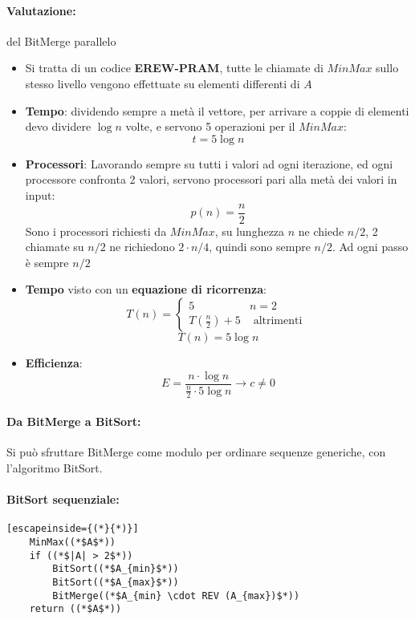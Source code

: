\newpage

\paragraph{Valutazione:} del BitMerge parallelo
\begin{itemize}
	\item Si tratta di un codice \textbf{EREW-PRAM}, tutte le chiamate di $MinMax$ sullo stesso livello vengono effettuate su elementi differenti di $A$
	
	\item \textbf{Tempo}: dividendo sempre a metà il vettore, per arrivare a coppie di elementi devo dividere $\log n$ volte, e servono 5 operazioni per il $MinMax$:
	$$ t = 5 \log n $$
	
	\item \textbf{Processori}: Lavorando sempre su tutti i valori ad ogni iterazione, ed ogni processore confronta 2 valori, servono processori pari alla metà dei valori in input:
	$$ p(n) = \frac{n}{2} $$
	Sono i processori richiesti da $MinMax$, su lunghezza $n$ ne chiede $n/2$, 2 chiamate su $n/2$ ne richiedono $2 \cdot n/4$, quindi sono sempre $n/2$. Ad ogni passo è sempre $n/2$
	
	\item \textbf{Tempo} visto con un \textbf{equazione di ricorrenza}: 
	$$ T(n) = \begin{cases}
		5 & n = 2 \\
		T(\frac{n}{2}) + 5 & \text{ altrimenti }
	\end{cases}
	$$
	$$ T(n) = 5 \log n $$
	
	\item \textbf{Efficienza}:
	$$ E = \frac{n \cdot \log n}{\frac{n}{2} \cdot 5 \log n} \rightarrow c \neq 0 $$
\end{itemize} 

\newpage

\paragraph{Da BitMerge a BitSort:} Si può sfruttare BitMerge come modulo per ordinare sequenze generiche, con l'algoritmo BitSort.\\

\paragraph{BitSort sequenziale:} \hfill 
\begin{lstlisting}[escapeinside={(*}{*)}]
	MinMax((*$A$*))
	if ((*$|A| > 2$*))
		BitSort((*$A_{min}$*))
		BitSort((*$A_{max}$*))
		BitMerge((*$A_{min} \cdot REV (A_{max})$*))
	return ((*$A$*))
\end{lstlisting}

